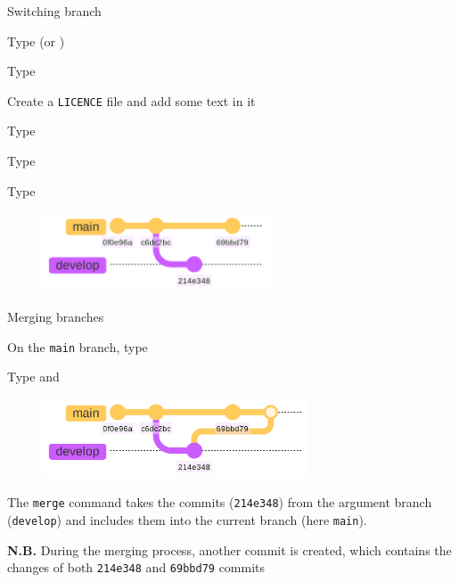 \documentclass[10pt]{beamer}
\begin{document}
\begin{frame}[fragile]{Switching branch}
\protect\hypertarget{switching-branch}{}

Type  (or )

Type 

Create a \texttt{LICENCE} file and add some text in it

Type 

Type 

Type 


\begin{figure}[H]

{\centering \includegraphics[width=0.6\textwidth]{mermaid/mermaid-figure-7.png}

}

\end{figure}
\end{frame}

\begin{frame}[fragile]{Merging branches}
\protect\hypertarget{merging-branches}{}

On the \texttt{main} branch, type

Type  and 

\begin{figure}[H]

{\centering \includegraphics[width=0.7\textwidth]{mermaid/mermaid-figure-6.png}

}

\end{figure}

The \texttt{merge} command takes the commits (\verb+214e348+) from the argument branch
(\texttt{develop}) and includes them into the current branch (here
\texttt{main}).


\textbf{N.B. }During the merging process, another commit is created, which contains the changes of both \verb+214e348+ and \verb+69bbd79+ commits

\end{frame}
\end{document}
